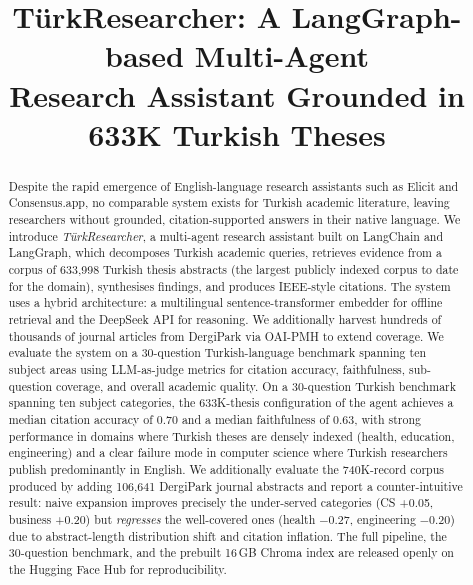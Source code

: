 \documentclass[conference]{IEEEtran}
\begin{document}
\title{T\"urkResearcher: A LangGraph-based Multi-Agent\\Research Assistant Grounded in 633K Turkish Theses}

\author{
}

\maketitle

\begin{abstract}
Despite the rapid emergence of English-language research assistants such as
Elicit and Consensus.app, no comparable system exists for Turkish academic
literature, leaving researchers without grounded, citation-supported answers
in their native language. We introduce \textit{T\"urkResearcher}, a multi-agent
research assistant built on LangChain and LangGraph, which decomposes Turkish
academic queries, retrieves evidence from a corpus of 633{,}998 Turkish thesis
abstracts (the largest publicly indexed corpus to date for the domain),
synthesises findings, and produces IEEE-style citations. The system uses a
hybrid architecture: a multilingual sentence-transformer embedder for offline
retrieval and the DeepSeek API for reasoning. We additionally harvest
hundreds of thousands of journal articles from DergiPark via OAI-PMH to
extend coverage. We evaluate the system on a 30-question Turkish-language
benchmark spanning ten subject areas using LLM-as-judge metrics for citation
accuracy, faithfulness, sub-question coverage, and overall academic quality.
On a 30-question Turkish benchmark spanning ten subject categories, the
633K-thesis configuration of the agent achieves a median citation
accuracy of 0.70 and a median faithfulness of 0.63, with strong
performance in domains where Turkish theses are densely indexed
(health, education, engineering) and a clear failure mode in computer
science where Turkish researchers publish predominantly in English. We
additionally evaluate the 740K-record corpus produced by adding
106{,}641 DergiPark journal abstracts and report a counter-intuitive
result: naive expansion improves precisely the under-served categories
(CS +0.05, business +0.20) but \emph{regresses} the well-covered ones
(health $-0.27$, engineering $-0.20$) due to abstract-length distribution
shift and citation inflation. The full pipeline, the 30-question
benchmark, and the prebuilt 16\,GB Chroma index are released openly on
the Hugging Face Hub for reproducibility.
\end{abstract}
\end{document}
